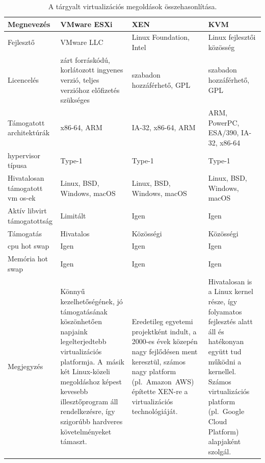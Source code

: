 \begin{table}[h!]
	\setlength{\tabcolsep}{5pt}
	\renewcommand{\arraystretch}{1.3}
	\centering
	\begin{tabular}{||p{3.25cm} p{3.25cm} p{3.25cm} p{3.25cm} ||}
		\hline
		Megnevezés & VMware ESXi & XEN & KVM \\
		\hline\hline
		Fejlesztő & VMware LLC & Linux Foundation, Intel & Linux fejlesztői közösség \\
		\hline
		Licencelés & zárt forráskódú, korlátozott ingyenes verzió, teljes verzióhoz előfizetés szükséges & szabadon hozzáférhető, GPL & szabadon hozzáférhető, GPL \\
		\hline
		Támogatott architektúrák & x86-64, ARM & IA-32, x86-64, ARM & ARM, PowerPC, ESA/390, IA-32, x86-64 \\
		\hline
		\Gls{hypervisor} típusa & Type-1 & Type-1 & Type-1 \\
		\hline
		Hivatalosan támogatott \acrshort{vm} \acrshort{os}-ek & Linux, BSD, Windows, macOS & Linux, BSD, Windows, macOS & Linux, BSD, Windows, macOS \\
		\hline
		Aktív \gls{libvirt} támogatottság & Limitált & Igen & Igen \\
		\hline
		Támogatás & Hivatalos & Közösségi & Közösségi  \\
		\hline
		\acrshort{cpu} hot swap & Igen & Igen & Igen \\
		\hline
		Memória hot swap & Igen & Igen & Igen \\
		\hline
		Megjegyzés & Könnyű kezelhetőségének, jó támogatásának köszönhetően napjaink legelterjedtebb virtualizációs platformja. A~másik két Linux-közeli megoldáshoz képest kevesebb illesztőprogram áll rendelkezésre, így szigorúbb hardveres követelményeket támaszt. & Eredetileg egyetemi projektként indult, a 2000-es évek közepén nagy fejlődésen ment keresztül, számos nagy platform (pl.~Amazon~AWS) építette XEN-re a virtualizációs technológiáját. & Hivatalosan is a Linux kernel része, így folyamatos fejlesztés alatt áll és hatékonyan együtt tud működni a kernellel. Számos virtualizációs platform (pl.~Google Cloud Platform) alapjaként szolgál.  \\
		\hline
	\end{tabular}
	\caption{A tárgyalt virtualizációs megoldások összehasonlítása.}
	\label{tab:hypervisor-comparison}
\end{table}


